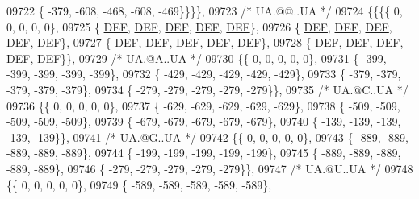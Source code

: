\begin{DoxyCode}
09722 \{ -379, -608, -468, -608, -469\}\}\}\},
09723 \textcolor{comment}{/* UA.@@..UA */}
09724 \{\{\{\{    0,    0,    0,    0,    0\},
09725 \{  \mbox{\hyperlink{1_88_84__epars_8h_a397419fc12b37ed479c8abb9d444d843}{DEF}},  \mbox{\hyperlink{1_88_84__epars_8h_a397419fc12b37ed479c8abb9d444d843}{DEF}},  \mbox{\hyperlink{1_88_84__epars_8h_a397419fc12b37ed479c8abb9d444d843}{DEF}},  \mbox{\hyperlink{1_88_84__epars_8h_a397419fc12b37ed479c8abb9d444d843}{DEF}},  \mbox{\hyperlink{1_88_84__epars_8h_a397419fc12b37ed479c8abb9d444d843}{DEF}}\},
09726 \{  \mbox{\hyperlink{1_88_84__epars_8h_a397419fc12b37ed479c8abb9d444d843}{DEF}},  \mbox{\hyperlink{1_88_84__epars_8h_a397419fc12b37ed479c8abb9d444d843}{DEF}},  \mbox{\hyperlink{1_88_84__epars_8h_a397419fc12b37ed479c8abb9d444d843}{DEF}},  \mbox{\hyperlink{1_88_84__epars_8h_a397419fc12b37ed479c8abb9d444d843}{DEF}},  \mbox{\hyperlink{1_88_84__epars_8h_a397419fc12b37ed479c8abb9d444d843}{DEF}}\},
09727 \{  \mbox{\hyperlink{1_88_84__epars_8h_a397419fc12b37ed479c8abb9d444d843}{DEF}},  \mbox{\hyperlink{1_88_84__epars_8h_a397419fc12b37ed479c8abb9d444d843}{DEF}},  \mbox{\hyperlink{1_88_84__epars_8h_a397419fc12b37ed479c8abb9d444d843}{DEF}},  \mbox{\hyperlink{1_88_84__epars_8h_a397419fc12b37ed479c8abb9d444d843}{DEF}},  \mbox{\hyperlink{1_88_84__epars_8h_a397419fc12b37ed479c8abb9d444d843}{DEF}}\},
09728 \{  \mbox{\hyperlink{1_88_84__epars_8h_a397419fc12b37ed479c8abb9d444d843}{DEF}},  \mbox{\hyperlink{1_88_84__epars_8h_a397419fc12b37ed479c8abb9d444d843}{DEF}},  \mbox{\hyperlink{1_88_84__epars_8h_a397419fc12b37ed479c8abb9d444d843}{DEF}},  \mbox{\hyperlink{1_88_84__epars_8h_a397419fc12b37ed479c8abb9d444d843}{DEF}},  \mbox{\hyperlink{1_88_84__epars_8h_a397419fc12b37ed479c8abb9d444d843}{DEF}}\}\},
09729 \textcolor{comment}{/* UA.@A..UA */}
09730 \{\{    0,    0,    0,    0,    0\},
09731 \{ -399, -399, -399, -399, -399\},
09732 \{ -429, -429, -429, -429, -429\},
09733 \{ -379, -379, -379, -379, -379\},
09734 \{ -279, -279, -279, -279, -279\}\},
09735 \textcolor{comment}{/* UA.@C..UA */}
09736 \{\{    0,    0,    0,    0,    0\},
09737 \{ -629, -629, -629, -629, -629\},
09738 \{ -509, -509, -509, -509, -509\},
09739 \{ -679, -679, -679, -679, -679\},
09740 \{ -139, -139, -139, -139, -139\}\},
09741 \textcolor{comment}{/* UA.@G..UA */}
09742 \{\{    0,    0,    0,    0,    0\},
09743 \{ -889, -889, -889, -889, -889\},
09744 \{ -199, -199, -199, -199, -199\},
09745 \{ -889, -889, -889, -889, -889\},
09746 \{ -279, -279, -279, -279, -279\}\},
09747 \textcolor{comment}{/* UA.@U..UA */}
09748 \{\{    0,    0,    0,    0,    0\},
09749 \{ -589, -589, -589, -589, -589\},

\end{DoxyCode}
